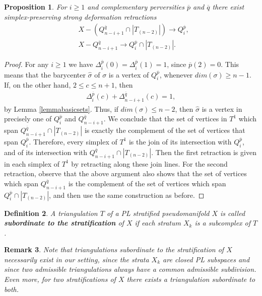 \documentclass{scrreprt}
\newtheorem{prop}{Proposition}[chapter]
\newtheorem{definition}[prop]{Definition}
\newtheorem{remark}[prop]{Remark}
\begin{document}
\begin{prop}\label{retractions}
For $i \geq 1$ and complementary perversities $\overline{p}$ and $\overline{q}$ there exist simplex-preserving strong deformation retractions
\begin{align*}
&X-(Q_{n-i+1}^{\overline{q}} \cap |T_{(n-2)}|) \to Q_i^{\overline{p}} , \\
&X- Q_{n-i+1}^{\overline{q}} \to Q_i^{\overline{p}} \cap |T_{(n-2)}|.
\end{align*}
\end{prop}

\begin{proof}
For any $i \geq 1$ we have $\Delta_i^{\overline{p}}(0)=\Delta_i^{\overline{p}}(1)=1$, since $\overline{p}(2)=0$. This means that the barycenter $\hat{\sigma}$ of $\sigma$ is a vertex of $Q_i^{\overline{p}}$, whenever $dim(\sigma) \geq n-1$. If, on the other hand, $2 \leq c \leq n+1$, then
\begin{align*}
\Delta_i^{\overline{p}}(c)+ \Delta_{n-i+1}^{\overline{q}}(c)=1,
\end{align*}
by Lemma \ref{lemmabasicsets}. Thus, if $dim(\sigma) \leq n-2$, then $\hat{\sigma}$ is a vertex in precisely one of $Q_i^{\overline{p}}$ and $Q_{n-i+1}^{\overline{q}}$. We conclude that the set of vertices in $T^1$ which span $Q_{n-i+1}^{\overline{q}} \cap |T_{(n-2)}|$ is exactly the complement of the set of vertices that span $Q_i^{\overline{p}}$. Therefore, every simplex of $T^1$ is the join of its intersection with $Q_i^{\overline{p}}$, and of its intersection with $Q_{n-i+1}^{\overline{q}} \cap |T_{(n-2)}|$. Then the first retraction is given in each simplex of $T^1$ by retracting along these join lines. For the second retraction, observe that the above argument also shows that the set of vertices which span $Q_{n-i+1}^{\overline{q}}$ is the complement of the set of vertices which span $Q_i^{\overline{p}} \cap |T_{(n-2)}|$, and then use the same construction as before.
\end{proof}

\begin{definition}
A triangulation $T$ of a PL stratified pseudomanifold $X$ is called \textbf{subordinate to the stratification} of $X$ if each stratum $X_k$ is a subcomplex of $T$.
\end{definition}

\begin{remark}
Note that triangulations subordinate to the stratification of $X$ necessarily exist in our setting, since the strata $X_k$ are closed PL subspaces and since two admissible triangulations always have a common admissible subdivision. Even more, for two stratifications of $X$ there exists a triangulation subordinate to both.
\end{remark}
\end{document}
